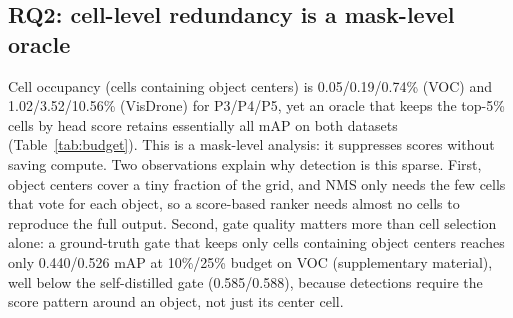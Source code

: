 \documentclass[a4paper,fleqn]{cas-dc}
\begin{document}
\subsection{RQ2: cell-level redundancy is a mask-level oracle}
Cell occupancy (cells containing object centers) is 0.05/0.19/0.74\% (VOC) and 1.02/3.52/10.56\% (VisDrone) for P3/P4/P5, yet an oracle that keeps the top-5\% cells by head score retains essentially all mAP on both datasets (Table~\ref{tab:budget}). This is a mask-level analysis: it suppresses scores without saving compute. Two observations explain why detection is this sparse. First, object centers cover a tiny fraction of the grid, and NMS only needs the few cells that vote for each object, so a score-based ranker needs almost no cells to reproduce the full output. Second, gate quality matters more than cell selection alone: a ground-truth gate that keeps only cells containing object centers reaches only 0.440/0.526 mAP at 10\%/25\% budget on VOC (supplementary material), well below the self-distilled gate (0.585/0.588), because detections require the score pattern around an object, not just its center cell.
\begin{table}[h]\centering\footnotesize
\caption{Budget curves (mAP50-95, mask-level): an oracle ranking cells by the model's own head scores retains essentially all mAP at 5\% of cells; the self-distilled gate is within 0.5\,pp of full accuracy at 10\% budget (VOC: 0.5852 vs.\ 0.5899; VisDrone: 0.1719 vs.\ 0.1725) and 1.1\,pp at 5\%; the energy gate degrades much more on dense VisDrone. The table shows the full 5--100\% curve; YOLO26s/26m ablations and per-gate details are in the supplementary material. These numbers assume full features; real skipping is analyzed in Table~\ref{tab:blockskip}.}
\label{tab:budget}

\end{table}
\end{document}
